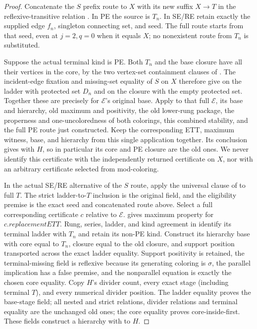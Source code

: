 \begin{proof}
Concatenate the \(S\) prefix route to \(X\) with its new suffix
\(X\to T\) in the reflexive-transitive relation
. In PE the source is \(T_n\).
In SE/RE retain exactly the supplied edge \(f_n\), singleton
connecting set, and  seed. The full
route starts from that seed, even at \(j=2,q=0\) when it equals
\(X\); no nonexistent route from \(T_n\) is substituted.

Suppose the actual terminal kind is PE. Both \(T_n\) and the base
closure have all their vertices in the core, by the two vertex-set
containment clauses of . The incident-edge
fixation and missing-set equality of \(S\) on \(X\) therefore
give  on the ladder with protected set \(D_n\)
and on the closure with the empty protected set. Together these are precisely
 for \(\mathcal E\)'s original base.
Apply  to that full \(\mathcal E\),
its base and hierarchy, old maximum and positivity, the old lower-rung
package, the properness and one-uncoloredness of both colorings, this
combined stability, and the full PE route just constructed.
Keep the corresponding ETT, maximum witness, base, and hierarchy from
this single application together. Its conclusion gives
 with \(H\), so in particular its
core and PE closure are the old ones. We never identify this certificate
with the independently returned certificate on \(X\), nor with an
arbitrary certificate selected from mod-coloring.

In the actual SE/RE alternative of the \(S\) route, apply the universal
clause of  to full \(T\).
The strict ladder-to-\(T\) inclusion is the original
 field, and the eligibility premise is
the exact seed and concatenated route above. Select a full corresponding
certificate \(c\) relative to \(\mathcal E\).
 gives maximum property for
\(c.\mathit{replacementETT}\).
Rung, series, ladder, and kind agreement in
 identify its terminal
ladder with \(T_n\) and retain its non-PE kind.
Construct its hierarchy base with core equal to \(T_n\), closure equal
to the old closure, and support position transported across the exact
ladder equality. Support positivity is retained, the terminal-missing
field is reflexive because its generating coloring is \(\sigma\),
the parallel implication has a false premise, and the nonparallel
equation is exactly the chosen core equality.
Copy \(H\)'s divider count, every exact stage (including terminal
\(T\)), and every numerical divider position. The ladder equality
proves the base-stage field; all nested and strict relations, divider
relations and terminal equality are the unchanged old ones; the core
equality proves core-inside-first. These fields construct a hierarchy
with  to \(H\).


\end{proof}
